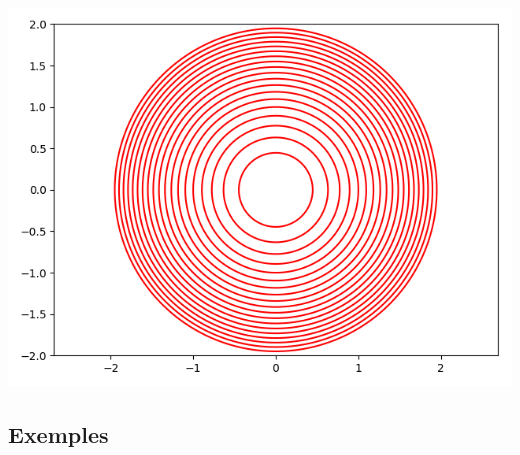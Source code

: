 \begin{exemple}{}{}
\begin{center}
		\includegraphics[scale=\myscale,scale=0.5]{figures/fonctions-niveau-1d}
	\end{center}
	
	
\end{exemple}


\subsection{Exemples}

